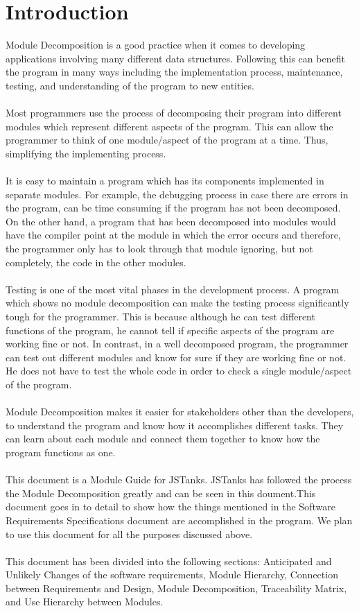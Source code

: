 \documentclass{article}
\begin{document}
\section{Introduction}
Module Decomposition is a good practice when it comes to developing applications involving many different data structures. Following this can benefit the program in many ways including the implementation process, maintenance, testing, and understanding of the program to new entities.\\ \\
Most programmers use the process of decomposing their program into different modules which represent different aspects of the program. This can allow the programmer to think of one module/aspect of the program at a time. Thus, simplifying the implementing process. \\ \\
It is easy to maintain a program which has its components implemented in separate modules. For example, the debugging process in case there are errors in the program, can be time consuming if the program has not been decomposed. On the other hand, a program that has been decomposed into modules would have the compiler point at the module in which the error occurs and therefore, the programmer only has to look through that module ignoring, but not completely, the code in the other modules.\\ \\
Testing is one of the most vital phases in the development process. A program which shows no module decomposition can make the testing process significantly tough for the programmer. This is because although he can test different functions of the program, he cannot tell if specific aspects of the program are working fine or not. In contrast, in a well decomposed program, the programmer can test out different modules and know for sure if they are working fine or not. He does not have to test the whole code in order to check a single module/aspect of the program. \\ \\
Module Decomposition makes it easier for stakeholders other than the developers, to understand the program and know how it accomplishes different tasks. They can learn about each module and connect them together to know how the program functions as one.\\ \\
This document is a Module Guide for JSTanks. JSTanks has followed the process the Module Decomposition greatly and can be seen in this doument.This document goes in to detail to show how the things mentioned in the Software Requirements Specifications document are accomplished in the program. We plan to use this document for all the purposes discussed above. \\ \\
This document has been divided into the following sections: Anticipated and Unlikely Changes of the software requirements, Module Hierarchy, Connection between Requirements and Design, Module Decomposition, Traceability Matrix, and Use Hierarchy between Modules.
\end{document}
